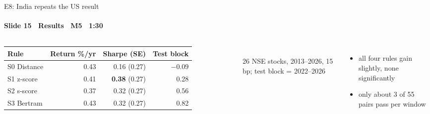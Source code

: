 \begin{frame}{E8: India repeats the US result}
\framesubtitle{Slide 15 \textbullet\ Results \textbullet\ M5 \textbullet\ 1:30}
\vspace{-2pt}
\begin{columns}[T,onlytextwidth]
  \footnotesize\setlength{\tabcolsep}{4pt}
  \begin{tabular}{@{}lrrr@{}}
    \toprule
    Rule & Return \%/yr & Sharpe (SE) & Test block \\
    \midrule
    S0 Distance & 0.43 & 0.16 (0.27) & $-0.09$ \\
    S1 z-score  & 0.41 & \textbf{0.38} (0.27) & 0.28 \\
    S2 s-score  & 0.37 & 0.32 (0.27) & 0.56 \\
    S3 Bertram  & 0.43 & 0.32 (0.27) & 0.82 \\
    \bottomrule
  \end{tabular}\\[2pt]
  {\scriptsize 26 NSE stocks, 2013--2026, 15 bp; test block = 2022--2026}
  \small\raggedright
  \begin{itemize}\setlength{\itemsep}{3pt}
    \item all four rules gain slightly, none significantly
    \item only about 3 of 55 pairs pass per window
  \end{itemize}
\end{columns}
\end{frame}

